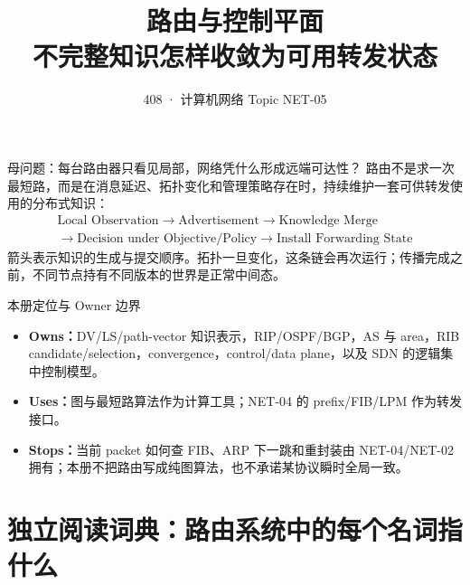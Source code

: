 \documentclass[11pt,a4paper]{ctexart}
\title{\vspace{-1.1cm}\textbf{路由与控制平面}\\[0.4em]\large 不完整知识怎样收敛为可用转发状态}
\author{408 · 计算机网络 Topic NET-05}
\date{}
\newcommand{\kw}[1]{\textbf{\color{deep}#1}}
\begin{document}
\maketitle

\begin{corebox}{母问题：每台路由器只看见局部，网络凭什么形成远端可达性？}
路由不是求一次最短路，而是在消息延迟、拓扑变化和管理策略存在时，持续维护一套可供转发使用的分布式知识：
\[
\boxed{\begin{gathered}
\text{Local Observation}\to\text{Advertisement}\to\text{Knowledge Merge}\\
\to\text{Decision under Objective/Policy}\to\text{Install Forwarding State}
\end{gathered}}
\]
箭头表示知识的生成与提交顺序。拓扑一旦变化，这条链会再次运行；传播完成之前，不同节点持有不同版本的世界是正常中间态。
\end{corebox}

\begin{methodbox}{本册定位与 Owner 边界}
\begin{itemize}
  \item \kw{Owns：}DV/LS/path-vector 知识表示，RIP/OSPF/BGP，AS 与 area，RIB candidate/selection，convergence，control/data plane，以及 SDN 的逻辑集中控制模型。
  \item \kw{Uses：}图与最短路算法作为计算工具；NET-04 的 prefix/FIB/LPM 作为转发接口。
  \item \kw{Stops：}当前 packet 如何查 FIB、ARP 下一跳和重封装由 NET-04/NET-02 拥有；本册不把路由写成纯图算法，也不承诺某协议瞬时全局一致。
\end{itemize}
\end{methodbox}

\section{独立阅读词典：路由系统中的每个名词指什么}
\end{document}
